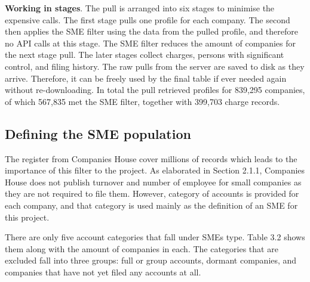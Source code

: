 \documentclass[ %
                    author={Natchalin Iwsakul \\[0.4em] Inkaphol Siriwongwattana \\[0.4em] Tanaphan Kummaraphat \\[0.6em] Patorn Srisupap},,
                supervisor={Fernando Moreno-Pino},
                    degree={MSc},
                     title={Propensity Modelling for SME Commercial Lending Using Open Public Data
},
                  subtitle={Companies House and GDELT as predictors of first-time borrowing},
                      type={},
                      year={2026}]{dissertation}
\begin{document}
  \textbf{Working in stages}. The pull is arranged into six stages to minimise the expensive calls. The first stage pulls one profile for each company. The second then applies the SME filter using the data from the pulled profile, and therefore no API calls at this stage. The SME filter reduces the amount of companies for the next stage pull. The later stages collect charges, persons with significant control, and filing history. The raw pulls from the server are saved to disk as they arrive. Therefore, it can be freely used by the final table if ever needed again without re-downloading. In total the pull retrieved profiles for 839,295 companies, of which 567,835 met the SME filter, together with 399,703 charge records.
  
  \subsection{Defining the SME population}
  \label{chap:defining_sme_pop}
The register from Companies House cover millions of records which leads to the importance of this filter to the project. As elaborated in Section 2.1.1, Companies House does not publish turnover and number of employee for small companies as they are not required to file them. However, category of accounts is provided for each company, and that category is used mainly as the definition of an SME for this project.

There are only five account categories that fall under SMEs type. Table 3.2 shows them along with the amount of companies in each. The categories that are excluded fall into three groups: full or group accounts, dormant companies, and companies that have not yet filed any accounts at all.
\end{document}
